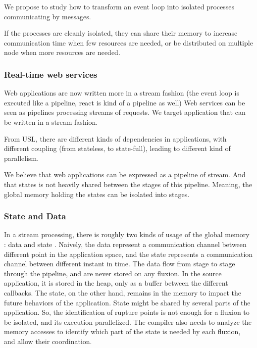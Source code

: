 We propose to study how to transform an event loop into isolated processes communicating by messages.

If the processes are cleanly isolated, they can share their memory to increase communication time when few resources are needed, or be distributed on multiple node when more resources are needed.

\subsubsection{Real-time web services}

Web applications are now written more in a stream fashion (the event loop is executed like a pipeline, react is kind of a pipeline as well)
Web services can be seen as pipelines processing streams of requests.
We target application that can be written in a stream fashion.

From USL, there are different kinds of dependencies in applications, with different coupling (from stateless, to state-full), leading to different kind of parallelism.

We believe that web applications can be expressed as a pipeline of stream.
And that states is not heavily shared between the stages of this pipeline.
Meaning, the global memory holding the states can be isolated into stages.

\subsubsection{State and Data}

In a stream processing, there is roughly two kinds of usage of the global memory : data and state \cite{Fernandez2014a}.
Naively, the data represent a communication channel between different point in the application space, and the state represents a communication channel between different instant in time.
The data flow from stage to stage through the pipeline, and are never stored on any fluxion. In the source application, it is stored in the heap, only as a buffer between the different callbacks.
The state, on the other hand, remains in the memory to impact the future behaviors of the application.
State might be shared by several parts of the application.
So, the identification of rupture points is not enough for a fluxion to be isolated, and its execution parallelized.
The compiler also needs to analyze the memory accesses to identify which part of the state is needed by each fluxion, and allow their coordination.


